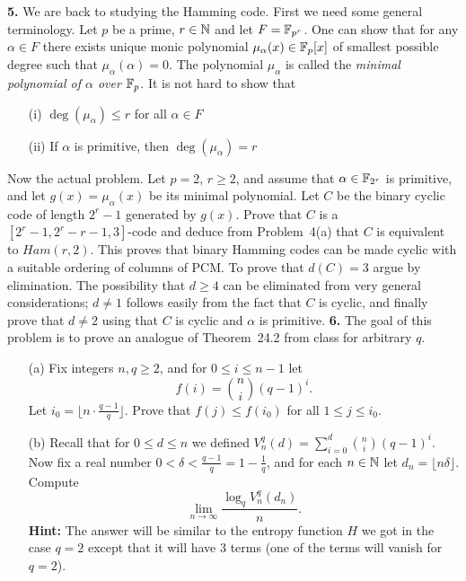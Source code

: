 \documentclass[12pt]{amsart}
\begin{document}
\newpage
{\bf 5.} We are back to studying the Hamming code. First we need some general terminology. Let $p$ be a prime, $r\in{\mathbb N}$ and let $F={\mathbb F}_{p^r}$. One can show that for any $\alpha\in F$ there exists unique monic polynomial $\mu_{\alpha}(x)\in{\mathbb F}_p[x]$ of smallest possible degree such that $\mu_{\alpha}(\alpha)=0$. The polynomial $\mu_{\alpha}$ is called the {\it minimal polynomial of $\alpha$ over ${\mathbb F}_p$}. It is not hard to show that
\begin{itemize}
\item[(i)] $\deg(\mu_{\alpha})\leq r$ for all $\alpha\in F$
\item[(ii)] If $\alpha$ is primitive, then $\deg(\mu_{\alpha})=r$
\end{itemize}
Now the actual problem. Let $p=2$, $r\geq 2$, and assume that $\alpha\in {\mathbb F}_{2^r}$ is primitive, and let $g(x)=\mu_{\alpha}(x)$
be its minimal polynomial. Let $C$ be the binary cyclic code of length $2^r-1$ generated by $g(x)$. Prove that
$C$ is a $[2^r-1,2^r-r-1,3]$-code and deduce from Problem~4(a) that $C$ is equivalent to $Ham(r,2)$. This proves that binary Hamming codes can be made cyclic with a suitable ordering of columns of PCM.
 To prove that $d(C)=3$ argue by elimination. The possibility that $d\geq 4$ can be eliminated from very general considerations; $d\neq 1$ follows easily from the fact that $C$ is cyclic, and finally prove that $d\neq 2$ using that $C$ is cyclic and $\alpha$ is primitive.
\skv
{\bf 6.} The goal of this problem is to prove an analogue of Theorem~24.2 from class for arbitrary $q$. 
\begin{itemize}
\item[(a)] Fix integers $n,q\geq 2$, and for $0\leq i\leq n-1$ let $$f(i)={n \choose i}(q-1)^i.$$ 
Let $i_0=\lfloor n\cdot \frac{q-1}{q}\rfloor$. Prove that $f(j)\leq f(i_0)$ for all $1\leq j\leq i_0$.
\item[(b)] Recall that for $0\leq d\leq n$ we defined $V_n^q(d)=\sum\limits_{i=0}^d {n\choose i}(q-1)^i$. Now fix a real number 
$0<\delta<\frac{q-1}{q}=1-\frac{1}{q}$, and for each $n\in{\mathbb N}$ let $d_n=\lfloor n\delta\rfloor$. Compute
$$\lim_{n\to\infty}\frac{\log_q V_n^q(d_n)}{n}.$$
{\bf Hint:} The answer will be similar to the entropy function $H$ we got in the case $q=2$ except that it will have 3 terms (one of the terms will vanish for $q=2$).
\end{itemize}
\end{document}
